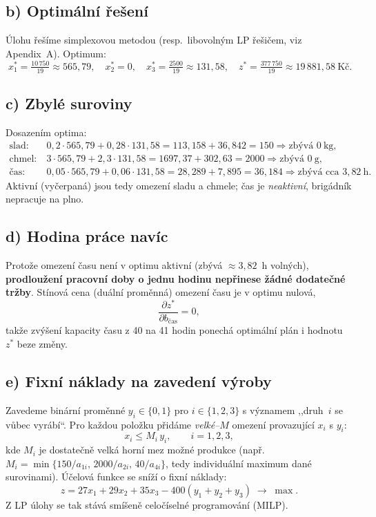 \documentclass[11pt,a4paper]{article}
\begin{document}
	\subsection*{b) Optimální řešení}
	
	Úlohu řešíme simplexovou metodou (resp.\ libovolným LP řešičem, viz Apendix~A). Optimum:
	\[
	\boxed{\;x_1^* = \tfrac{10\,750}{19}\approx 565{,}79,\quad x_2^*=0,\quad x_3^*=\tfrac{2500}{19}\approx 131{,}58,\quad z^*=\tfrac{377\,750}{19}\approx 19\,881{,}58~\text{Kč}.\;}
	\]
	
	\subsection*{c) Zbylé suroviny}
	
	Dosazením optima:
	\[
	\begin{aligned}
		\text{slad:}\ &0{,}2\cdot 565{,}79+0{,}28\cdot 131{,}58 = 113{,}158+36{,}842 = 150 \Rightarrow \text{zbývá } 0~\text{kg},\\
		\text{chmel:}\ &3\cdot 565{,}79+2{,}3\cdot 131{,}58 = 1697{,}37+302{,}63 = 2000 \Rightarrow \text{zbývá } 0~\text{g},\\
		\text{čas:}\ &0{,}05\cdot 565{,}79+0{,}06\cdot 131{,}58 = 28{,}289+7{,}895 = 36{,}184 \Rightarrow \text{zbývá cca } 3{,}82~\text{h}.
	\end{aligned}
	\]
	Aktivní (vyčerpaná) jsou tedy omezení sladu a chmele; čas je \emph{neaktivní}, brigádník nepracuje na plno.
	
	\subsection*{d) Hodina práce navíc}
	
	Protože omezení času není v optimu aktivní (zbývá $\approx 3{,}82$~h volných), \textbf{prodloužení pracovní doby o jednu hodinu nepřinese žádné dodatečné tržby}. Stínová cena (duální proměnná) omezení času je v optimu nulová,
	\[
	\frac{\partial z^*}{\partial b_{\text{čas}}}=0,
	\]
	takže zvýšení kapacity času z 40 na 41 hodin ponechá optimální plán i hodnotu $z^*$ beze změny.
	
	\subsection*{e) Fixní náklady na zavedení výroby}
	
	Zavedeme binární proměnné $y_i\in\{0,1\}$ pro $i\in\{1,2,3\}$ s významem ,,druh~$i$ se vůbec vyrábí``. Pro každou položku přidáme \emph{velké--$M$} omezení provazující $x_i$ s $y_i$:
	\[
	x_i \leq M_i\, y_i,\qquad i=1,2,3,
	\]
	kde $M_i$ je dostatečně velká horní mez možné produkce (např.\ $M_i = \min\{150/a_{1i},\,2000/a_{2i},\,40/a_{4i}\}$, tedy individuální maximum dané surovinami). Účelová funkce se sníží o fixní náklady:
	\[
	z = 27x_1+29x_2+35x_3 - 400(y_1+y_2+y_3) \;\to\;\max.
	\]
	Z LP úlohy se tak stává smíšeně celočíselné programování (MILP).
	
\end{document}
